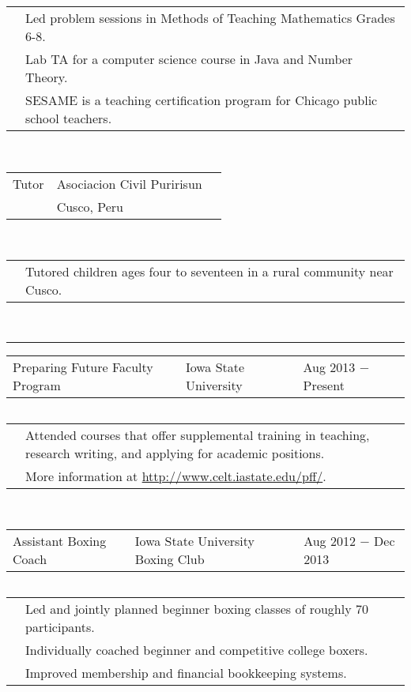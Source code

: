 \documentclass{article}
\newcommand{\q}{$\quad$ \newline}
\newcommand{\vl}{4.25}
\newcommand{\wl}{8.4}
\newcommand{\ww}{13}
\newcommand{\myrule}{\noindent \rule{\textwidth}{1pt}}
\begin{document}
\noindent \begin{tabular}{@{}p{\vl cm}p{\ww cm}@{}}
& Led problem sessions in Methods of Teaching Mathematics Grades 6-8. \\
& Lab TA for a computer science course in Java and Number Theory. \\
& SESAME is a teaching certification program for Chicago public school teachers.
\end{tabular} \q \q  

\noindent \begin{tabular}{@{}p{\vl cm}p{\wl cm}l@{}}
Tutor & Asociacion Civil Puririsun & \\
& Cusco, Peru
\end{tabular} \q \q

\noindent \begin{tabular}{@{}p{\vl cm}p{\ww cm}@{}}
& Tutored children ages four to seventeen in a rural community near Cusco.
\end{tabular} \q \q


\myrule


\noindent \begin{tabular}{@{}p{\vl cm}p{\wl cm}l@{}}
Preparing Future Faculty Program & Iowa State University & Aug 2013 $-$ Present
\end{tabular} \q 
 
\noindent \begin{tabular}{@{}p{\vl cm}p{\ww cm}@{}}
& Attended courses that offer supplemental training in teaching, research writing, and applying for academic positions. \\
& More information at \url{http://www.celt.iastate.edu/pff/}.
\end{tabular} \q \q
 
 
 
 
\noindent \begin{tabular}{@{}p{\vl cm}p{\wl cm}l@{}}
Assistant Boxing Coach & Iowa State University Boxing Club & Aug 2012 $-$ Dec 2013
\end{tabular} \q 
 
\noindent \begin{tabular}{@{}p{\vl cm}p{\ww cm}@{}}
& Led and jointly planned beginner boxing classes of roughly 70 participants. \\
& Individually coached beginner and competitive college boxers. \\
& Improved membership and financial bookkeeping systems.
\end{tabular} \q \q
\end{document}
